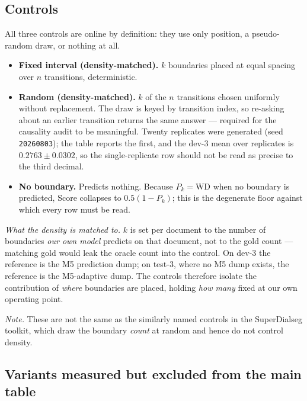 \subsection{Controls}
\label{app:baselines-controls}

All three controls are online by definition: they use only position, a
pseudo-random draw, or nothing at all.

\begin{itemize}\itemsep3pt
\item \textbf{Fixed interval (density-matched).} $k$ boundaries placed at
      equal spacing over $n$ transitions, deterministic.
\item \textbf{Random (density-matched).} $k$ of the $n$ transitions chosen
      uniformly without replacement. The draw is keyed by transition index, so
      re-asking about an earlier transition returns the same answer --- required
      for the causality audit to be meaningful. Twenty replicates were generated
      (seed \texttt{20260803}); the table reports the first, and the dev-3 mean
      over replicates is $0.2763 \pm 0.0302$, so the single-replicate row should
      not be read as precise to the third decimal.
\item \textbf{No boundary.} Predicts nothing. Because $P_k = \mathrm{WD}$ when
      no boundary is predicted, Score collapses to $0.5(1-P_k)$; this is the
      degenerate floor against which every row must be read.
\end{itemize}

\emph{What the density is matched to.} $k$ is set per document to the number of
boundaries \emph{our own model} predicts on that document, not to the gold
count --- matching gold would leak the oracle count into the control. On dev-3
the reference is the M5 prediction dump; on test-3, where no M5 dump exists, the
reference is the M5-adaptive dump. The controls therefore isolate the
contribution of \emph{where} boundaries are placed, holding \emph{how many}
fixed at our own operating point.

\emph{Note.} These are not the same as the similarly named controls in the
SuperDialseg toolkit, which draw the boundary \emph{count} at random and hence
do not control density.

\subsection{Variants measured but excluded from the main table}
\label{app:baselines-excluded}

